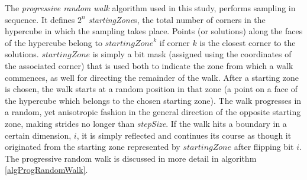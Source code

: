 \documentclass[conference]{IEEEtran}
\begin{document}
The \textit{progressive random walk} \cite{malan2014progressive} algorithm used in this study, performs sampling in sequence. It defines $2^n$ \textit{startingZone}s, the total number of corners in the hypercube in which the sampling takes place. Points (or solutions) along the faces of the hypercube belong to $\textit{startingZone}^{k}$ if corner $k$ is the closest corner to the solutions. $startingZone$ is simply a bit mask (assigned using the coordinates of the associated corner) that is used both to indicate the zone from which a walk commences, as well for directing the remainder of the walk. After a starting zone is chosen, the walk starts at a random position in that zone (a point on a face of the hypercube which belongs to the chosen starting zone). The walk progresses in a random, yet anisotropic fashion in the general direction of the opposite starting zone, making strides no longer than \textit{stepSize}. If the walk hits a boundary in a certain dimension, $i$, it is simply reflected and continues its course as though it originated from the starting zone represented by $startingZone$ after flipping bit $i$. The progressive random walk is discussed in more detail in algorithm \ref{algProgRandomWalk}.
\end{document}
